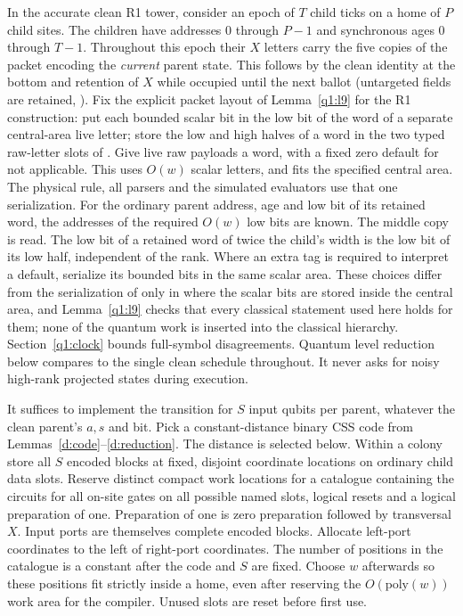 In the accurate clean R1 tower, consider an epoch of \(T\) child ticks on a home of \(P\) child sites. The children have addresses 0 through \(P-1\) and synchronous ages 0 through \(T-1\). Throughout this epoch their \(X\) letters carry the five copies of the packet encoding the \emph{current} parent state. This follows by the clean identity \cite[Lemma~\ref*{cl:lem:clean}]{DMNoise1D2026} at the bottom and retention of \(X\) while occupied until the next ballot (untargeted fields are retained, \cite[Section~\ref*{cl:sec:native}]{DMNoise1D2026}). Fix the explicit packet layout of Lemma~\ref{q1:l9} for the R1 construction: put each bounded scalar bit in the low bit of the word of a separate central-area live letter; store the low and high halves of a word in the two typed raw-letter slots of \cite[Section~\ref*{cl:sec:packets}]{DMNoise1D2026}. Give live raw payloads a word, with a fixed zero default for not applicable. This uses \(O(w)\) scalar letters, and fits the specified central area. The physical rule, all parsers and the simulated evaluators use that one serialization. For the ordinary parent address, age and low bit of its retained word, the addresses of the required \(O(w)\) low bits are known. The middle copy is read. The low bit of a retained word of twice the child's width is the low bit of its low half, independent of the rank. Where an extra tag is required to interpret a default, serialize its bounded bits in the same scalar area. These choices differ from the serialization of \cite[Section~\ref*{cl:sec:packets}]{DMNoise1D2026} only in where the scalar bits are stored inside the central area, and Lemma~\ref{q1:l9} checks that every classical statement used here holds for them; none of the quantum work is inserted into the classical hierarchy. Section~\ref{q1:clock} bounds full-symbol disagreements. Quantum level reduction below compares to the single clean schedule throughout. It never asks for noisy high-rank projected states during execution.

It suffices to implement the transition for \(S\) input qubits per parent, whatever the clean parent's \(a,s\) and bit. Pick a constant-distance binary CSS code from Lemmas~\ref{d:code}--\ref{d:reduction}. The distance is selected below. Within a colony store all \(S\) encoded blocks at fixed, disjoint coordinate locations on ordinary child data slots. Reserve distinct compact work locations for a catalogue containing the circuits for all on-site gates on all possible named slots, logical resets and a logical preparation of one. Preparation of one is zero preparation followed by transversal \(X\). Input ports are themselves complete encoded blocks. Allocate left-port coordinates to the left of right-port coordinates. The number of positions in the catalogue is a constant after the code and \(S\) are fixed. Choose \(w\) afterwards so these positions fit strictly inside a home, even after reserving the \(O(\mathrm{poly}(w))\) work area for the compiler. Unused slots are reset before first use.


